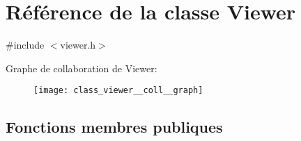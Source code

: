 \hypertarget{class_viewer}{}\section{Référence de la classe Viewer}
\label{class_viewer}


{\ttfamily \#include $<$viewer.\+h$>$}



Graphe de collaboration de Viewer\+:
\nopagebreak
\begin{figure}[H]
\begin{center}
\leavevmode
\texttt{[image: class\_viewer\_\_coll\_\_graph]}
\end{center}
\end{figure}
\subsection*{Fonctions membres publiques}
